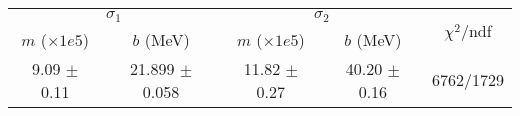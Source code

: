 \begin{tabular}{cc|cc||c}
\multicolumn{2}{c|}{$\sigma_1$} & \multicolumn{2}{|c}{$\sigma_2$} & \multirow{2}{*}{$\chi^2/$ndf} \\
$m$ ($\times1e5$) & $b$ (MeV) & $m$ ($\times1e5$) & $b$ (MeV) & \\
\hline
9.09 $\pm$ 0.11 & 21.899 $\pm$ 0.058 & 11.82 $\pm$ 0.27 & 40.20 $\pm$ 0.16 & 6762/1729\\
\end{tabular}

